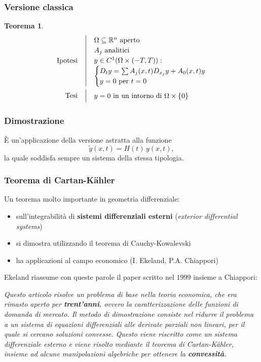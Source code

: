 \documentclass[serif,notheorems]{beamer}
\makeatletter
\newenvironment{ipotesi}%
{\quad\left|\quad\def\arraystretch{1.2}\begin{array}{@{}l@{}}}%
{\end{array}\right.}
\newcommand{\hpth}[2]
{
\begin{align*}
\quad
\text{Ipotesi}
&\begin{ipotesi}
#1
\end{ipotesi}\\
\text{Tesi}
&\begin{ipotesi}
#2
\end{ipotesi}
\end{align*}
}
\theoremstyle{definition} %
\newtheorem{theorem}{Teorema}[section] %
\theoremstyle{remark}
\makeatother
\begin{document}
\begin{frame}
\frametitle{Versione classica}
\begin{theorem}
\hpth{
\Omega \subseteq \mathbb{R}^n \text{ aperto}\\
A_j \text{ analitici}\\
y\in C^1 (\Omega \times (-T,T)): \\ 
\begin{cases}
D_t y = \sum A_j (x,t) D_{x_j}y+A_0(x,t)y \\
y=0 \text{ per } t=0
\end{cases} \\
}{
y = 0 \text{ in un intorno di } \Omega \times \{ 0\}
}
\end{theorem}
\end{frame}

\begin{frame}
\frametitle{Dimostrazione}
È un'applicazione della versione astratta alla funzione $$\widetilde{y}(x,t) = H(t) \, y(x,t),$$ 
la quale soddisfa sempre un sistema della stessa tipologia.
\end{frame}

\begin{frame}
\frametitle{Teorema di Cartan-Kähler}
Un teorema molto importante in geometria differenziale:
\begin{itemize}
\item sull'integrabilità di \textbf{sistemi differenziali esterni} (\textit{exterior differential systems})
\item si dimostra utilizzando il teorema di Cauchy-Kowalevski
\item ha applicazioni al campo economico (I. Ekeland, P.A. Chiappori)
\end{itemize}
\end{frame}

\begin{frame}
Ekeland riassume con queste parole il paper scritto nel $1999$ insieme a Chiappori:\\
\begin{center}
\textit{Questo articolo risolve un problema di base nella teoria economica, che era rimasto aperto per \textbf{trent'anni}, ovvero la caratterizzazione delle funzioni di domanda di mercato. Il metodo di dimostrazione consiste nel ridurre il problema a un sistema di equazioni differenziali alle derivate parziali non lineari, per il quale si cercano soluzioni convesse. Questo viene riscritto come un sistema differenziale esterno e viene risolto mediante il teorema di Cartan-Kähler, insieme ad alcune manipolazioni algebriche per ottenere la \textbf{convessità}.}
\end{center}
\end{frame}
\end{document}
